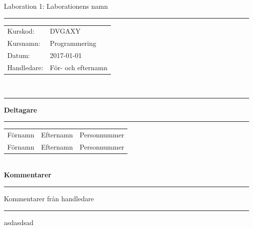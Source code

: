 \documentclass[a4paper, 11pt, oneside]{report}
\begin{document}
\begin{titlepage} %
    \thispagestyle{fancy}
    \cfoot{}

    \vspace*{\baselineskip} %
    {\LARGE\noindent Laboration 1: Laborationens namn}\\
    \rule[3mm]{\textwidth}{0.4pt} %
    \begin{tabular}{ll}
        Kurskod:    & DVGAXY \\
        Kursnamn:   & Programmering \\
        Datum:      & 2017-01-01 \\
        Handledare: & För- och efternamn \\
    \end{tabular} \\
    \rule{\textwidth}{0.4pt} %

    \vspace{\baselineskip} %

    {\bf\noindent Deltagare}\\
    \rule[3mm]{\textwidth}{0.4pt} %
    \begin{tabular}{lll}
        Förnamn     & Efternamn     & Personnummer \\
        Förnamn     & Efternamn     & Personnummer \\
    \end{tabular} \\

    \vspace{3\baselineskip} %
    {\bf\noindent Kommentarer}\\
    \rule[3mm]{\textwidth}{0.4pt} %
    Kommentarer från handledare \\
    \rule{\textwidth}{0.4pt} %


\end{titlepage}

\newpage
asdasdsad
\end{document}
